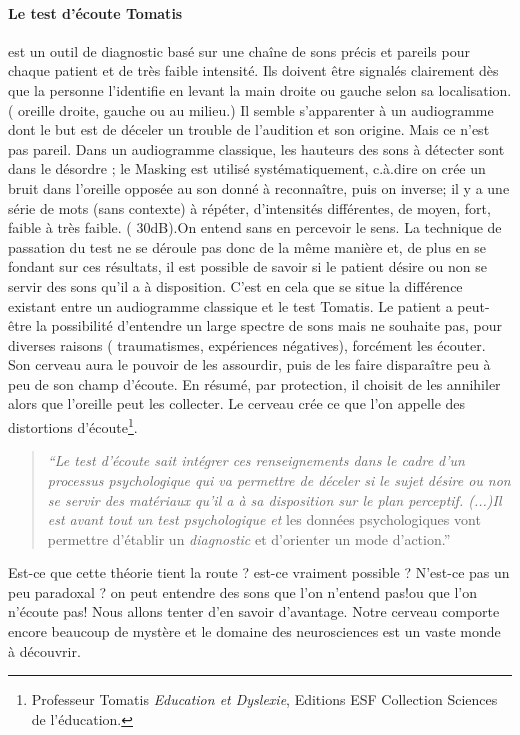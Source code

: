 \paragraph{Le test d'écoute Tomatis}
  est un outil de diagnostic basé sur une chaîne de sons précis et
  pareils pour chaque patient et de très faible intensité. Ils doivent
  être signalés clairement dès que la personne l'identifie en levant
  la main droite ou gauche selon sa localisation. ( oreille droite,
  gauche ou au milieu.)  Il semble s'apparenter à un audiogramme dont
  le but est de déceler un trouble de l'audition et son origine. Mais
  ce n'est pas pareil. Dans un audiogramme classique, les hauteurs des
  sons à détecter sont dans le désordre ; le Masking est utilisé
  systématiquement, c.à.dire on crée un bruit dans l'oreille opposée
  au son donné à reconnaître, puis on inverse; il y a une série de
  mots (sans contexte) à répéter, d'intensités différentes, de moyen,
  fort, faible à très faible. ( 30dB).On entend sans en percevoir le
  sens.  La technique de passation du test ne se déroule pas donc de
  la même manière et, de plus en se fondant sur ces résultats, il est
  possible de savoir si le patient désire ou non se servir des sons
  qu'il a à disposition.  C'est en cela que se situe la différence
  existant entre un audiogramme classique et le test Tomatis. Le
  patient a peut-être la possibilité d'entendre un large spectre de
  sons mais ne souhaite pas, pour diverses raisons ( traumatismes,
  expériences négatives), forcément les écouter. Son cerveau aura le
  pouvoir de les assourdir, puis de les faire disparaître peu à peu de
  son champ d'écoute. En résumé, par protection, il choisit de les
  annihiler alors que l'oreille peut les collecter. Le cerveau crée ce
  que l'on appelle des distortions d'écoute\footnote{Professeur
    Tomatis \emph{Education et Dyslexie},  Editions ESF
    Collection Sciences de l'éducation.}. %

\begin{quote}
\emph{``Le test d'écoute sait intégrer ces renseignements dans le
cadre d'un processus psychologique qui va permettre de déceler si
le sujet désire ou non se servir des matériaux qu'il a à sa disposition
sur le plan perceptif. (...)Il est avant tout un test psychologique
et} les données psychologiques vont permettre d'établir un\emph{ diagnostic}
et d'orienter un mode d'action.''
\end{quote}

Est-ce que cette théorie tient la route ? est-ce vraiment possible
? N'est-ce pas un peu paradoxal ? on peut entendre des sons que l'on
n'entend pas!ou que l'on n'écoute pas! Nous allons tenter d'en savoir
d'avantage. Notre cerveau comporte encore beaucoup de mystère et le
domaine des neurosciences est un vaste monde à découvrir. 

